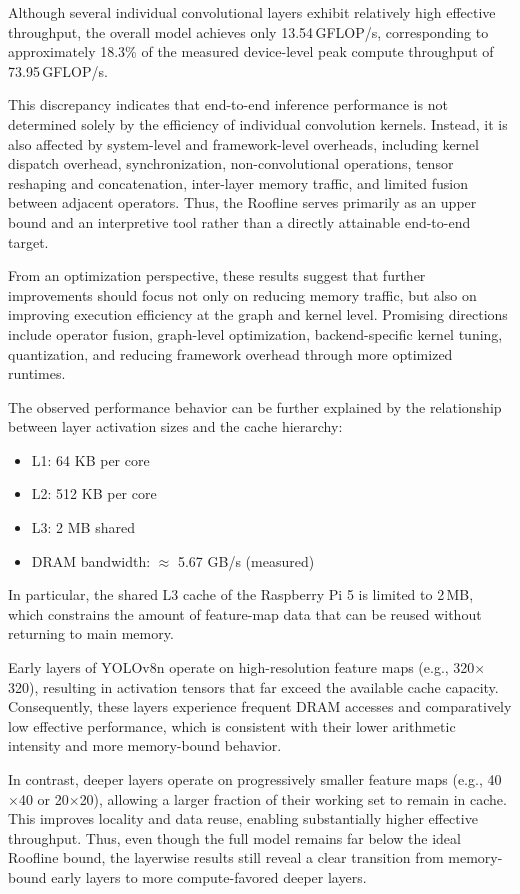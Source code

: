 \documentclass[12pt,a4paper]{report}
\begin{document}
Although several individual convolutional layers exhibit relatively high effective throughput,
the overall model achieves only 13.54\,GFLOP/s, corresponding to approximately 18.3\% of the
measured device-level peak compute throughput of 73.95\,GFLOP/s.

This discrepancy indicates that end-to-end inference performance is not determined solely by the
efficiency of individual convolution kernels. Instead, it is also affected by system-level and
framework-level overheads, including kernel dispatch overhead, synchronization, non-convolutional
operations, tensor reshaping and concatenation, inter-layer memory traffic, and limited fusion
between adjacent operators. Thus, the Roofline serves primarily as an upper bound and an interpretive
tool rather than a directly attainable end-to-end target.

From an optimization perspective, these results suggest that further improvements should focus not
only on reducing memory traffic, but also on improving execution efficiency at the graph and kernel
level. Promising directions include operator fusion, graph-level optimization, backend-specific kernel
tuning, quantization, and reducing framework overhead through more optimized runtimes.

\noindent The observed performance behavior can be further explained by the relationship between
layer activation sizes and the cache hierarchy:

\begin{itemize}
    \item L1: 64 KB per core
    \item L2: 512 KB per core
    \item L3: 2 MB shared
    \item DRAM bandwidth: $\approx$ 5.67 GB/s (measured)
\end{itemize}

In particular, the shared L3 cache of the Raspberry Pi 5 is limited to 2\,MB, which constrains
the amount of feature-map data that can be reused without returning to main memory.

Early layers of YOLOv8n operate on high-resolution feature maps (e.g., 320$\times$320),
resulting in activation tensors that far exceed the available cache capacity.
Consequently, these layers experience frequent DRAM accesses and comparatively low effective performance,
which is consistent with their lower arithmetic intensity and more memory-bound behavior.

In contrast, deeper layers operate on progressively smaller feature maps (e.g., 40$\times$40
or 20$\times$20), allowing a larger fraction of their working set to remain in cache.
This improves locality and data reuse, enabling substantially higher effective throughput.
Thus, even though the full model remains far below the ideal Roofline bound, the layerwise results
still reveal a clear transition from memory-bound early layers to more compute-favored deeper layers.
\end{document}

